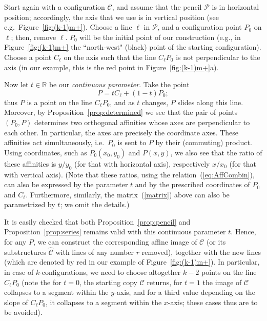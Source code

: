 \documentclass[reqno,12pt]{amsart}
\theoremstyle{plain}
\theoremstyle{definition}
\theoremstyle{remark}
\begin{document}
Start again with a configuration $\mathcal C$, and assume that the pencil $\mathcal P$ is in horizontal position; accordingly, the axis 
that we use is in vertical position (see e.g.\ Figure~\ref{fig:(k-1)m+}). Choose a line $\ell$ in $\mathcal P$, and a configuration point 
$P_0$ on $\ell$; then, remove $\ell$. $P_0$ will be the initial point of our construction (e.g., in Figure~\ref{fig:(k-1)m+} the ``north-west" 
(black) point of the starting configuration). Choose a point $C_{\ell}$ on the axis such that the line $C_{\ell}P_0$ is not perpendicular to 
the axis (in our example, this is the red point in Figure~\ref{fig:(k-1)m+}a).

Now let $t\in\mathbb R$ be our \emph{continuous parameter}. Take the point 
%
\begin{equation} \label{eq:AffCombin}
P=tC_{\ell}+(1-t)P_0;
\end{equation}
 thus $P$ is a point on the line $C_{\ell}P_0$, and as $t$ changes, $P$ slides along this line. Moreover, by Proposition~\ref{prop:determined}
we see that the pair of points $(P_0,P)$ determines two orthogonal affinities whose axes are perpendicular to each other. In particular, the
axes are precisely the coordinate axes. These affinities act simultaneously, i.e.\ $P_0$ is sent to $P$ by their (commuting) product. Using coordinates,
such as $P_0(x_0,y_0)$ and $P(x,y)$, we also see that the ratio of these affinities is $y/y_0$ (for that with horizontal axis), respectively $x/x_0$ 
(for that with vertical axis). (Note that these ratios, using the relation~(\ref{eq:AffCombin}), can also be expressed by the parameter $t$ and by 
the prescribed coordinates of $P_0$ and $C_{\ell}$. Furthermore, similarly, the matrix~(\ref{matrix}) above can also be parametrized by $t$; 
we omit the details.)

It is easily checked that both Proposition~\ref{prop:pencil} and Proposition~\ref{prop:series} remains valid with this continuous parameter $t$.
Hence, for any $P$, we can construct the corresponding affine image of $\mathcal C$ (or its substructures $\hat {\mathcal C}$ with lines of any 
number $r$ removed), together with the new lines (which are denoted by red in our example of Figure~\ref{fig:(k-1)m+}). In particular, in case 
of $k$-configurations, we need to choose altogether $k-2$ points on the line $C_{\ell}P_0$ (note the for $t=0$, the starting copy $\mathcal C$
returns, for $t=1$ the image of $\mathcal C$ collapses to a segment within the $y$-axis, and for a third value depending on the slope of $C_{\ell}P_0$,
it collapses to a segment within the $x$-axis; these cases thus are to be avoided).
\end{document}
